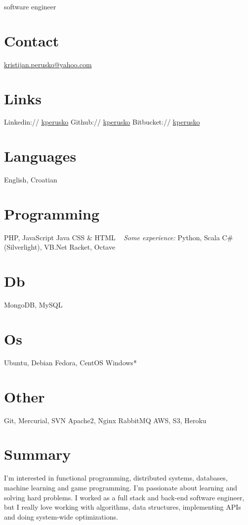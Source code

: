 \documentclass[]{cv}
\begin{document}
       {software engineer}


\begin{aside}
  \section{Contact}
    \href{mailto:kristijan.perusko@yahoo.com}{kristijan.perusko@yahoo.com}
  \section{Links}  
    Linkedin://  \href{https://www.linkedin.com/in/kperusko}{kperusko}
    Github:// \href{https://github.com/kperusko}{kperusko}
    Bitbucket:// \href{https://bitbucket.org/kperusko}{kperusko}
  \section{Languages}
    English, Croatian
  \section{Programming}
    PHP, JavaScript
    Java
    CSS \& HTML
~     
    \emph{Some experience:}
    Python, Scala
    C\# (Silverlight), VB.Net
    Racket, Octave
  \section{Db}
    MongoDB, MySQL
  \section{Os}
    Ubuntu, Debian 
    Fedora, CentOS
    Windows*
  \section{Other}
    Git, Mercurial, SVN
    Apache2, Nginx
    RabbitMQ
    AWS, S3, Heroku
\end{aside}

\section{Summary}

I’m interested in functional programming, distributed systems, databases, machine learning and game programming. I'm passionate about learning and solving hard problems. I worked as a full stack and back-end software engineer, but I really love working with algorithms, data structures, implementing APIs and doing system-wide optimizations.
\end{document}
